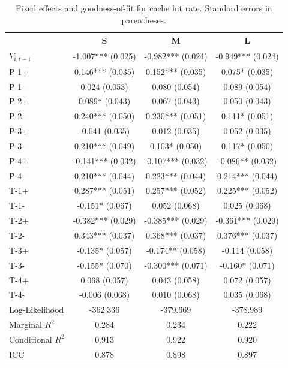 \begin{table}[H]
\caption{Fixed effects and goodness-of-fit for cache hit rate. Standard errors in parentheses.}
\label{tab:full_cache_hit_rate}
\begin{tabular}{lccc}
\toprule
 & S & M & L \\
\midrule
$Y_{i,t-1}$ & -1.007*** (0.025) & -0.982*** (0.024) & -0.949*** (0.024) \\
P-1+ & 0.146*** (0.035) & 0.152*** (0.035) & 0.075* (0.035) \\
P-1- & 0.024 (0.053) & 0.080 (0.054) & 0.089 (0.054) \\
P-2+ & 0.089* (0.043) & 0.067 (0.043) & 0.050 (0.043) \\
P-2- & 0.240*** (0.050) & 0.230*** (0.051) & 0.111* (0.051) \\
P-3+ & -0.041 (0.035) & 0.012 (0.035) & 0.052 (0.035) \\
P-3- & 0.210*** (0.049) & 0.103* (0.050) & 0.117* (0.050) \\
P-4+ & -0.141*** (0.032) & -0.107*** (0.032) & -0.086** (0.032) \\
P-4- & 0.210*** (0.044) & 0.223*** (0.044) & 0.214*** (0.044) \\
T-1+ & 0.287*** (0.051) & 0.257*** (0.052) & 0.225*** (0.052) \\
T-1- & -0.151* (0.067) & 0.052 (0.068) & 0.025 (0.068) \\
T-2+ & -0.382*** (0.029) & -0.385*** (0.029) & -0.361*** (0.029) \\
T-2- & 0.343*** (0.037) & 0.368*** (0.037) & 0.376*** (0.037) \\
T-3+ & -0.135* (0.057) & -0.174** (0.058) & -0.114 (0.058) \\
T-3- & -0.155* (0.070) & -0.300*** (0.071) & -0.160* (0.071) \\
T-4+ & 0.068 (0.057) & 0.043 (0.058) & 0.072 (0.057) \\
T-4- & -0.006 (0.068) & 0.010 (0.068) & 0.035 (0.068) \\
\midrule
Log-Likelihood & -362.336 & -379.669 & -378.989 \\
Marginal $R^2$ & 0.284 & 0.234 & 0.222 \\
Conditional $R^2$ & 0.913 & 0.922 & 0.920 \\
ICC & 0.878 & 0.898 & 0.897 \\
\bottomrule
\end{tabular}
\end{table}

